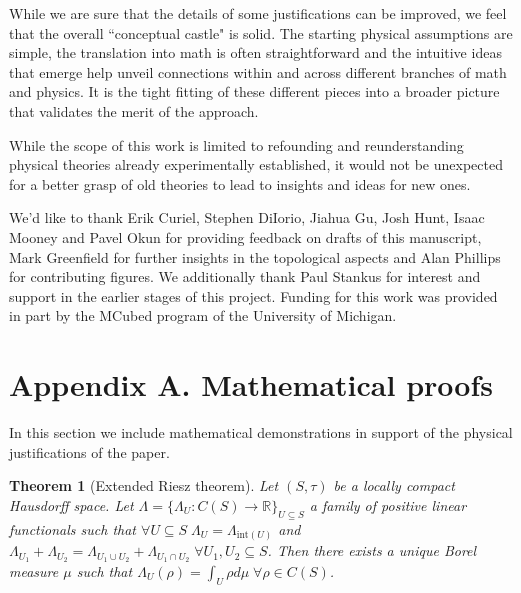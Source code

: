 \documentclass[smallextended]{svjour3}
\numberwithin{equation}{section}
\newtheorem{thrm}[equation]{Theorem}
\theoremstyle{definition}
\begin{document}
While we are sure that the details of some justifications can be improved, we feel that the overall ``conceptual castle" is solid. The starting physical assumptions are simple, the translation into math is often straightforward and the intuitive ideas that emerge help unveil connections within and across different branches of math and physics. It is the tight fitting of these different pieces into a broader picture that validates the merit of the approach.

While the scope of this work is limited to refounding and reunderstanding physical theories already experimentally established, it would not be unexpected for a better grasp of old theories to lead to insights and ideas for new ones.



\begin{acknowledgements}
We'd like to thank Erik Curiel, Stephen DiIorio, Jiahua Gu, Josh Hunt, Isaac Mooney and Pavel Okun for providing feedback on drafts of this manuscript, Mark Greenfield for further insights in the topological aspects and Alan Phillips for contributing figures. We additionally thank Paul Stankus for interest and support in the earlier stages of this project. Funding for this work was provided in part by the MCubed program of the University of Michigan.
\end{acknowledgements}

\appendix
\section*{Appendix A. Mathematical proofs}

In this section we include mathematical demonstrations in support of the physical justifications of the paper.

\begin{thrm}[Extended Riesz theorem]\label{extended_riesz_theorem}
	Let $(S, \tau)$ be a locally compact Hausdorff space. Let $\Lambda = \{\Lambda_U : C(S) \rightarrow \mathbb{R}\}_{U \subseteq S}$ a family of positive linear functionals such that $\forall U \subseteq S \; \Lambda_U = \Lambda_{\mathrm{int}(U)}$ and $\Lambda_{U_1} + \Lambda_{U_2} = \Lambda_{U_1 \cup U_2} + \Lambda_{U_1 \cap U_2} \; \forall U_1, U_2 \subseteq S$. Then there exists a unique Borel measure $\mu$ such that $\Lambda_U (\rho) = \int_{U} \rho d\mu \; \forall \rho \in C(S)$.
\end{thrm}
\end{document}
